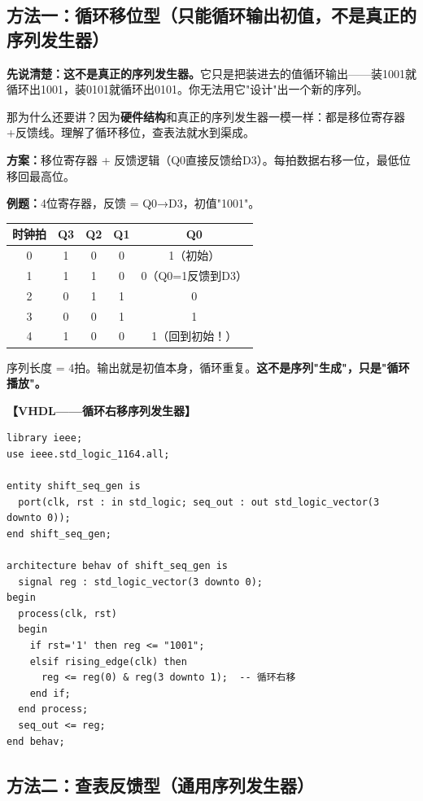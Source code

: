 \subsection{方法一：循环移位型（只能循环输出初值，不是真正的序列发生器）}

\textbf{先说清楚：这不是真正的序列发生器。}它只是把装进去的值循环输出——装1001就循环出1001，装0101就循环出0101。你无法用它"设计"出一个新的序列。

那为什么还要讲？因为\textbf{硬件结构}和真正的序列发生器一模一样：都是移位寄存器+反馈线。理解了循环移位，查表法就水到渠成。

\textbf{方案：}移位寄存器 + 反馈逻辑（Q0直接反馈给D3）。每拍数据右移一位，最低位移回最高位。

\textbf{例题：}4位寄存器，反馈 = Q0→D3，初值"1001"。

\begin{center}
\begin{tabular}{|c|c|c|c|c|}
\hline
时钟拍 & Q3 & Q2 & Q1 & Q0 \\
\hline
0 & 1 & 0 & 0 & 1（初始）\\
1 & 1 & 1 & 0 & 0（Q0=1反馈到D3）\\
2 & 0 & 1 & 1 & 0 \\
3 & 0 & 0 & 1 & 1 \\
4 & 1 & 0 & 0 & 1（回到初始！）\\
\hline
\end{tabular}
\end{center}

序列长度 = 4拍。输出就是初值本身，循环重复。\textbf{这不是序列"生成"，只是"循环播放"。}

\textbf{【VHDL——循环右移序列发生器】}
\begin{lstlisting}
library ieee;
use ieee.std_logic_1164.all;

entity shift_seq_gen is
  port(clk, rst : in std_logic; seq_out : out std_logic_vector(3 downto 0));
end shift_seq_gen;

architecture behav of shift_seq_gen is
  signal reg : std_logic_vector(3 downto 0);
begin
  process(clk, rst)
  begin
    if rst='1' then reg <= "1001";
    elsif rising_edge(clk) then
      reg <= reg(0) & reg(3 downto 1);  -- 循环右移
    end if;
  end process;
  seq_out <= reg;
end behav;
\end{lstlisting}

\subsection{方法二：查表反馈型（通用序列发生器）}

